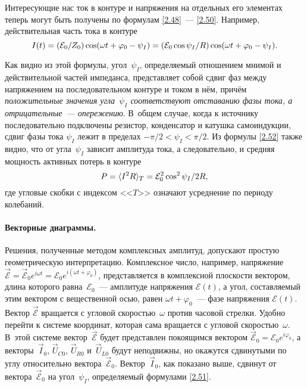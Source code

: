 Интересующие нас ток в контуре и напряжения на отдельных его элементах теперь
могут быть получены по формулам \eqref{2.48}~--- \eqref{2.50}. Например,
действительная часть тока в контуре
\begin{equation}
	\eqmark{2.52}
	I(t)=(\mathcal{E}_0/Z_0)\cos(\omega
t+\varphi_0-\psi_I)=(\mathcal{E}_0\cos\psi_I/R)\cos(\omega t+\varphi_0-\psi_I).
\end{equation}

Как видно из этой формулы, угол~$\psi_I$, определяемый отношением мнимой и
действительной частей импеданса, представляет собой сдвиг фаз между напряжением
на последовательном контуре и током в нём, причём \emph{положительные
значения угла~$\psi_I$ соответствуют отставанию фазы тока, а
отрицательные~--- опережению}. В~общем случае, когда к источнику последовательно
подключены резистор, конденсатор и катушка самоиндукции, сдвиг фазы тока
$\psi_I$ лежит в пределах $-\pi/2<\psi_I<\pi/2$. Из формулы \eqref{2.52} также
видно, что от угла~$\psi_I$ зависит амплитуда тока, а следовательно, и средняя
мощность активных потерь в контуре
\begin{equation}\eqmark{2.53}
	P=\langle I^2R\rangle_T=\mathcal{E}_0^2\cos^2\psi_I/2R,
\end{equation}
где угловые скобки с индексом <<$T$>> означают усреднение по периоду колебаний.

\paragraph{Векторные диаграммы.}
Решения, полученные методом комплексных амплитуд, допускают простую
геометрическую интерпретацию. Комплексное число, например, напряжение
$\vec{\mathcal{E}}=\vec{\mathcal{E}}_0e^{i\omega t}=\mathcal{E}_0e^{i(\omega
t+\varphi_0)}$, представляется в комплексной плоскости вектором, длина которого
равна~$\mathcal{E}_0$~--- амплитуде напряжения $\mathcal{E}(t)$, а угол,
составляемый этим вектором с вещественной осью, равен $\omega
t+\varphi_0$~--- фазе напряжения $\mathcal{E}(t)$. Вектор $\vec{\mathcal{E}}$
вращается с угловой скоростью~$\omega$ против часовой стрелки. Удобно перейти к
системе координат, которая сама вращается с угловой скоростью~$\omega$. В~этой
системе вектор~$\vec{\mathcal{E}}$ будет представлен покоящимся вектором
$\vec{\mathcal{E}}_0=\mathcal{E}_0e^{i\varphi_0}$, а векторы~$\vec I_0$, $\vec U_{C0}$,
$\vec U_{R0}$ и~$\vec U_{L0}$ будут неподвижны, но окажутся сдвинутыми по углу
относительно вектора~$\vec{\mathcal{E}}_0$. Вектор~$\vec I_0$, как показано выше,
сдвинут от вектора~$\vec{\mathcal{E}}_0$ на угол~$\psi_I$, определяемый формулами
\eqref{2.51}.

